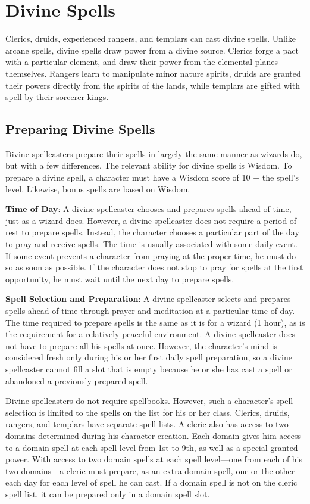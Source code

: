 \section{Divine Spells}
Clerics, druids, experienced rangers, and templars can cast divine spells. Unlike arcane spells, divine spells draw power from a divine source. Clerics forge a pact with a particular element, and draw their power from the elemental planes themselves. Rangers learn to manipulate minor nature spirits, druids are granted their powers directly from the spirits of the lands, while templars are gifted with spell by their sorcerer-kings.

\subsection{Preparing Divine Spells}
Divine spellcasters prepare their spells in largely the same manner as wizards do, but with a few differences. The relevant ability for divine spells is Wisdom. To prepare a divine spell, a character must have a Wisdom score of 10 + the spell's level. Likewise, bonus spells are based on Wisdom.

\textbf{Time of Day}: A divine spellcaster chooses and prepares spells ahead of time, just as a wizard does. However, a divine spellcaster does not require a period of rest to prepare spells. Instead, the character chooses a particular part of the day to pray and receive spells. The time is usually associated with some daily event. If some event prevents a character from praying at the proper time, he must do so as soon as possible. If the character does not stop to pray for spells at the first opportunity, he must wait until the next day to prepare spells.

\textbf{Spell Selection and Preparation}: A divine spellcaster selects and prepares spells ahead of time through prayer and meditation at a particular time of day. The time required to prepare spells is the same as it is for a wizard (1 hour), as is the requirement for a relatively peaceful environment. A divine spellcaster does not have to prepare all his spells at once. However, the character's mind is considered fresh only during his or her first daily spell preparation, so a divine spellcaster cannot fill a slot that is empty because he or she has cast a spell or abandoned a previously prepared spell.

Divine spellcasters do not require spellbooks. However, such a character's spell selection is limited to the spells on the list for his or her class. Clerics, druids, rangers, and templars have separate spell lists. A cleric also has access to two domains determined during his character creation. Each domain gives him access to a domain spell at each spell level from 1st to 9th, as well as a special granted power. With access to two domain spells at each spell level---one from each of his two domains---a cleric must prepare, as an extra domain spell, one or the other each day for each level of spell he can cast. If a domain spell is not on the cleric spell list, it can be prepared only in a domain spell slot.

